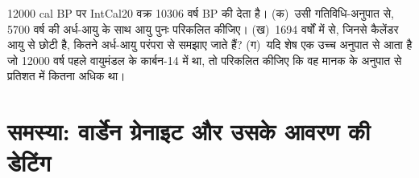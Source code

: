 \begin{exercise}[$\star\star\star$]\label{exo:b1:radiometric-methods:12}
\num{12000} cal BP पर IntCal20 वक्र \num{10306} वर्ष BP की  देता है। (क)~उसी गतिविधि-अनुपात से, \num{5700} वर्ष की अर्ध-आयु के साथ आयु पुनः परिकलित कीजिए। (ख)~\num{1694} वर्षों में से, जिनसे  कैलेंडर आयु से छोटी है, कितने अर्ध-आयु परंपरा से समझाए जाते हैं? (ग)~यदि शेष एक उच्च अनुपात से आता है जो \num{12000} वर्ष पहले वायुमंडल के कार्बन-14 में था, तो परिकलित कीजिए कि वह मानक के अनुपात से प्रतिशत में कितना अधिक था।
\end{exercise}

\section{समस्या: वार्डेन ग्रेनाइट और उसके आवरण की डेटिंग}

